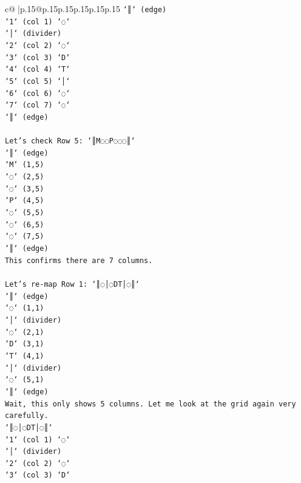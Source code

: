 \documentclass{article}
\begin{document}
{\begin{supertabular}{c@{$\;$}|p{.15\linewidth}@{}p{.15\linewidth}p{.15\linewidth}p{.15\linewidth}p{.15\linewidth}p{.15\linewidth}}
{{{\texttt{`║` (edge)} \\
\texttt{`1` (col 1) `◌`} \\
\texttt{`│` (divider)} \\
\texttt{`2` (col 2) `◌`} \\
\texttt{`3` (col 3) `D`} \\
\texttt{`4` (col 4) `T`} \\
\texttt{`5` (col 5) `│`} \\
\texttt{`6` (col 6) `◌`} \\
\texttt{`7` (col 7) `◌`} \\
\texttt{`║` (edge)} \\
\\ 
\texttt{Let's check Row 5: `║M◌◌P◌◌◌║`} \\
\texttt{`║` (edge)} \\
\texttt{`M` (1,5)} \\
\texttt{`◌` (2,5)} \\
\texttt{`◌` (3,5)} \\
\texttt{`P` (4,5)} \\
\texttt{`◌` (5,5)} \\
\texttt{`◌` (6,5)} \\
\texttt{`◌` (7,5)} \\
\texttt{`║` (edge)} \\
\texttt{This confirms there are 7 columns.} \\
\\ 
\texttt{Let's re{-}map Row 1: `║◌│◌DT│◌║`} \\
\texttt{`║` (edge)} \\
\texttt{`◌` (1,1)} \\
\texttt{`│` (divider)} \\
\texttt{`◌` (2,1)} \\
\texttt{`D` (3,1)} \\
\texttt{`T` (4,1)} \\
\texttt{`│` (divider)} \\
\texttt{`◌` (5,1)} \\
\texttt{`║` (edge)} \\
\texttt{Wait, this only shows 5 columns. Let me look at the grid again very carefully.} \\
\texttt{`║◌│◌DT│◌║`} \\
\texttt{`1` (col 1) `◌`} \\
\texttt{`│` (divider)} \\
\texttt{`2` (col 2) `◌`} \\
\texttt{`3` (col 3) `D`} \\
}}}
\end{supertabular}}
\end{document}
